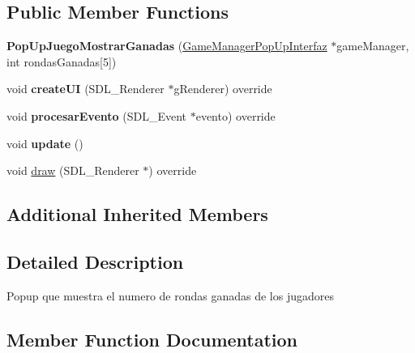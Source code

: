 \subsection*{Public Member Functions}
\begin{DoxyCompactItemize}
\item 
{\bfseries Pop\+Up\+Juego\+Mostrar\+Ganadas} (\hyperlink{class_game_manager_pop_up_interfaz}{Game\+Manager\+Pop\+Up\+Interfaz} $\ast$game\+Manager, int rondas\+Ganadas\mbox{[}5\mbox{]})\hypertarget{class_pop_up_juego_mostrar_ganadas_a8058dd552baf3d067cf4c4d3d56a69b6}{}\label{class_pop_up_juego_mostrar_ganadas_a8058dd552baf3d067cf4c4d3d56a69b6}

\item 
void {\bfseries create\+UI} (S\+D\+L\+\_\+\+Renderer $\ast$g\+Renderer) override\hypertarget{class_pop_up_juego_mostrar_ganadas_a46efefa1a398ab63bfc2dd7549a25302}{}\label{class_pop_up_juego_mostrar_ganadas_a46efefa1a398ab63bfc2dd7549a25302}

\item 
void {\bfseries procesar\+Evento} (S\+D\+L\+\_\+\+Event $\ast$evento) override\hypertarget{class_pop_up_juego_mostrar_ganadas_ad2f6ba541e7a56c42cd69c0557ef057c}{}\label{class_pop_up_juego_mostrar_ganadas_ad2f6ba541e7a56c42cd69c0557ef057c}

\item 
void {\bfseries update} ()\hypertarget{class_pop_up_juego_mostrar_ganadas_a215ca8122276c972599f8bcad570bdb0}{}\label{class_pop_up_juego_mostrar_ganadas_a215ca8122276c972599f8bcad570bdb0}

\item 
void \hyperlink{class_pop_up_juego_mostrar_ganadas_ab965ba319c903712dcbe94d3c08348ea}{draw} (S\+D\+L\+\_\+\+Renderer $\ast$) override
\end{DoxyCompactItemize}
\subsection*{Additional Inherited Members}


\subsection{Detailed Description}
Popup que muestra el numero de rondas ganadas de los jugadores 

\subsection{Member Function Documentation}
